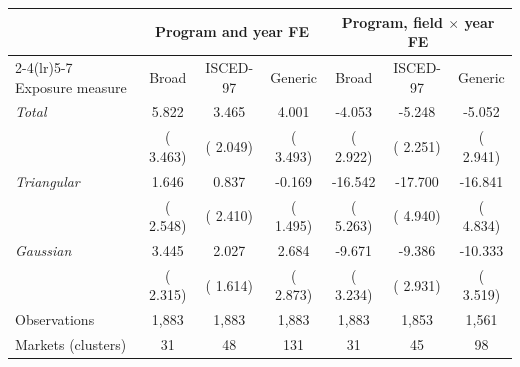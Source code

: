 \begin{tabular}{lcccccc}
\toprule
 & \multicolumn{3}{c}{Program and year FE} & \multicolumn{3}{c}{Program, field \(\times\) year FE} \\
\cmidrule(lr){2-4}\cmidrule(lr){5-7}
Exposure measure & Broad & ISCED-97 & Generic & Broad & ISCED-97 & Generic \\
\midrule
\textit{Total} &   5.822 &   3.465\sym{*} &   4.001 &  -4.053 &  -5.248\sym{**} &  -5.052\sym{*} \\
 & ( 3.463) & ( 2.049) & ( 3.493) & ( 2.922) & ( 2.251) & ( 2.941) \\
\textit{Triangular} &   1.646 &   0.837 &  -0.169 & -16.542\sym{***} & -17.700\sym{***} & -16.841\sym{***} \\
 & ( 2.548) & ( 2.410) & ( 1.495) & ( 5.263) & ( 4.940) & ( 4.834) \\
\textit{Gaussian} &   3.445 &   2.027 &   2.684 &  -9.671\sym{***} &  -9.386\sym{***} & -10.333\sym{***} \\
 & ( 2.315) & ( 1.614) & ( 2.873) & ( 3.234) & ( 2.931) & ( 3.519) \\
\midrule
Observations &  1,883 &  1,883 &  1,883 &  1,883 &  1,853 &  1,561 \\
Markets (clusters) &     31 &     48 &    131 &     31 &     45 &     98 \\
\bottomrule
\end{tabular}
